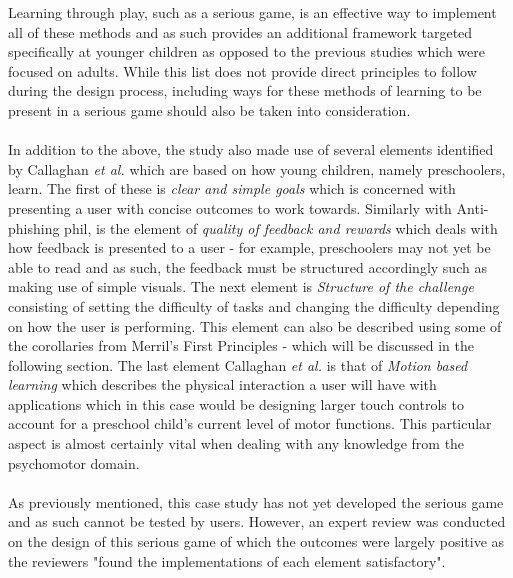\documentclass[conference]{IEEEtran}
\begin{document}
Learning through play, such as a serious game, is an effective way to implement all of these methods\cite{allers2021children} and as such provides an additional framework targeted specifically at younger children as opposed to the previous studies\cite{Dincelli2020,Sheng2007} which were focused on adults. While this list does not provide direct principles to follow during the design process, including ways for these methods of learning to be present in a serious game should also be taken into consideration.
\\\\
In addition to the above, the study also made use of several elements identified by Callaghan \textit{et al.}\cite{callaghan2018} which are based on how young children, namely preschoolers, learn. The first of these is \textit{clear and simple goals} which is concerned with presenting a user with concise outcomes to work towards\cite{callaghan2018}. Similarly with Anti-phishing phil\cite{Sheng2007}, is the element of \textit{quality of feedback and rewards} which deals with how feedback is presented to a user - for example, preschoolers may not yet be able to read and as such, the feedback must be structured accordingly such as making use of simple visuals\cite{allers2021children}. The next element is \textit{Structure of the challenge} consisting of setting the difficulty of tasks and changing the difficulty depending on how the user is performing\cite{callaghan2018}. This element can also be described using some of the corollaries from Merril's First Principles\cite{Merrill2002} - which will be discussed in the following section. The last element Callaghan \textit{et al.}\cite{callaghan2018} is that of \textit{Motion based learning} which describes the physical interaction a user will have with applications which in this case would be designing larger touch controls to account for a preschool child's current level of motor functions. This particular aspect is almost certainly vital when dealing with any knowledge from the psychomotor domain.
\\\\
As previously mentioned, this case study has not yet developed the serious game and as such cannot be tested by users. However, an expert review was conducted on the design of this serious game of which the outcomes were largely positive as the reviewers "found the implementations of each element satisfactory"\cite{allers2021children}.
\end{document}
